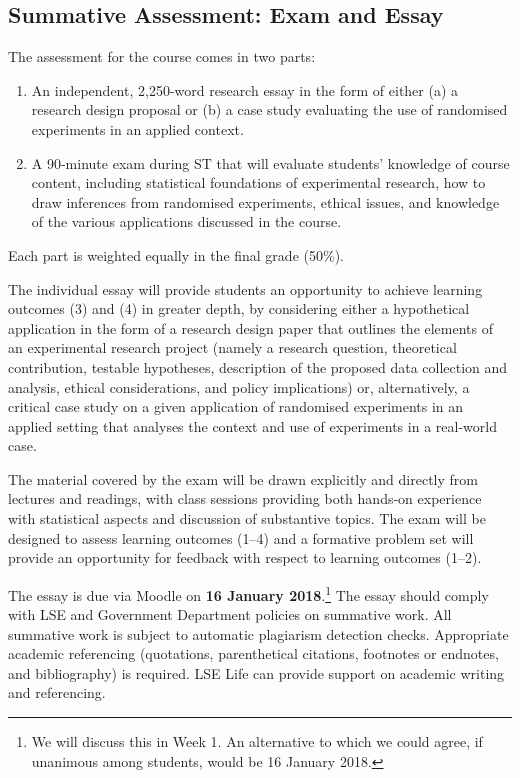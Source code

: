 \documentclass[12pt,a4paper]{article}
\begin{document}
\subsection{Summative Assessment: Exam and Essay}

The assessment for the course comes in two parts:

\begin{enumerate}
\item An independent, 2,250-word research essay in the form of either (a) a research design proposal or (b) a case study evaluating the use of randomised experiments in an applied context.
\item A 90-minute exam during ST that will evaluate students' knowledge of course content, including statistical foundations of experimental research, how to draw inferences from randomised experiments, ethical issues, and knowledge of the various applications discussed in the course.
\end{enumerate}

\noindent Each part is weighted equally in the final grade (50\%).

The individual essay will provide students an opportunity to achieve learning outcomes (3) and (4) in greater depth, by considering either a hypothetical application in the form of a research design paper that outlines the elements of an experimental research project (namely a research question, theoretical contribution, testable hypotheses, description of the proposed data collection and analysis, ethical considerations, and policy implications) or, alternatively, a critical case study on a given application of randomised experiments in an applied setting that analyses the context and use of experiments in a real-world case.

The material covered by the exam will be drawn explicitly and directly from lectures and readings, with class sessions providing both hands-on experience with statistical aspects and discussion of substantive topics. The exam will be designed to assess learning outcomes (1--4) and a formative problem set will provide an opportunity for feedback with respect to learning outcomes (1--2).

The essay is due via Moodle on \textbf{16 January 2018}.\footnote{We will discuss this in Week 1. An alternative to which we could agree, if unanimous among students, would be 16 January 2018.} The essay should comply with LSE and Government Department policies on summative work. All summative work is subject to automatic plagiarism detection checks. Appropriate academic referencing (quotations, parenthetical citations, footnotes or endnotes, and bibliography) is required. LSE Life can provide support on academic writing and referencing.
\end{document}
